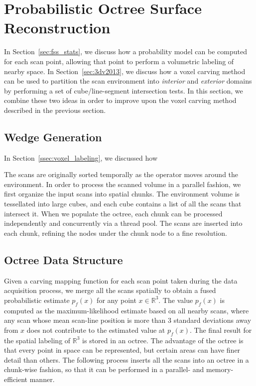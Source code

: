 \documentclass[12pt,onecolumn,oneside]{book}
\begin{document}
\section{Probabilistic Octree Surface Reconstruction}
\label{sec:procarve}

In Section~\ref{sec:fss_stats}, we discuss how a probability model can be computed for each scan point, allowing that point to perform a volumetric labeling of nearby space.  In Section~\ref{sec:3dv2013}, we discuss how a voxel carving method can be used to partition the scan environment into {\it interior} and {\it exterior} domains by performing a set of cube/line-segment intersection tests.  In this section, we combine these two ideas in order to improve upon the voxel carving method described in the previous section.

\subsection{Wedge Generation}
\label{ssec:procarve_wedge_and_chunk}

In Section~\ref{ssec:voxel_labeling}, we discussed how 

The scans are originally sorted temporally as the operator moves around the environment.  In order to process the scanned volume in a parallel fashion, we first organize the input scans into spatial chunks.  The environment volume is tessellated into large cubes, and each cube contains a list of all the scans that intersect it.  When we populate the octree, each chunk can be processed independently and concurrently via a thread pool.  The scans are inserted into each chunk, refining the nodes under the chunk node to a fine resolution.  

\subsection{Octree Data Structure}
\label{ssec:procarve_octree}


Given a carving mapping function for each scan point taken during the data acquisition process, we merge all the scans spatially to obtain a fused probabilistic estimate $p_f(x)$ for any point $x \in \mathbb{R}^3$.  The value $p_f(x)$ is computed as the maximum-likelihood estimate based on all nearby scans, where any scan whose mean scan-line position is more than $3$ standard deviations away from $x$ does not contribute to the estimated value at $p_f(x)$.  The final result for the spatial labeling of $\mathbb{R}^3$ is stored in an octree.  The advantage of the octree is that every point in space can be represented, but certain areas can have finer detail than others.  The following process inserts all the scans into an octree in a chunk-wise fashion, so that it can be performed in a parallel- and memory-efficient manner.
\end{document}
